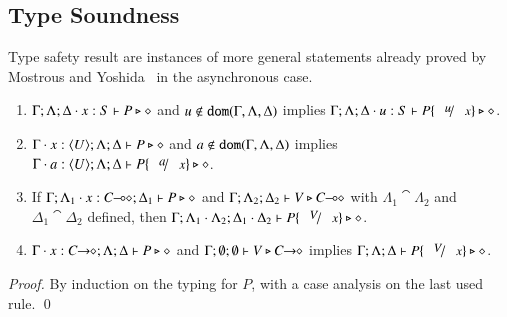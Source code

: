 \subsection{Type Soundness}

Type safety result are instances of more general
statements already proved by
Mostrous and Yoshida~\cite{tlca07} in the asynchronous case.
%
\begin{lemma}\rm
	\label{lem:subst}
	\begin{enumerate}[1.]
		\item	$\Gamma; \Lambda; \Delta \cdot x:S  \vdash P \triangleright \diamond$ and
			$u \not\in \mathtt{dom}(\Gamma, \Lambda, \Delta)$
			implies
			$\Gamma; \Lambda; \Delta \cat u:S  \proves P\subst{u}{x} \hastype \Proc$.

		\item	$\Gamma \cdot x:\langle U \rangle; \Lambda; \Delta \vdash P \triangleright \diamond$ and
			$a \notin \mathtt{dom}(\Gamma, \Lambda, \Delta)$
			implies
			$\Gamma \cat a:\chtype{U}; \Lambda; \Delta \proves P\subst{a}{x} \hastype \Proc$.

		\item	If $\Gamma; \Lambda_1 \cdot x:C\!\! \multimap\!\! \diamond; \Delta_1  \vdash P \triangleright \diamond$ 
			and $\Gamma; \Lambda_2; \Delta_2  \vdash V \triangleright C\!\! \multimap\!\! \diamond$ with 
			$\Lambda_1 \cat \Lambda_2$ and $\Delta_1 \cat \Delta_2$ defined,
			then $\Gamma; \Lambda_1 \cat \Lambda_2; \Delta_1 \cat \Delta_2  \proves P\subst{V}{x} \hastype \Proc$.

		\item	$\Gamma \cdot x:C\!\! \rightarrow\!\! \diamond; \Lambda; \Delta  \vdash P \triangleright \diamond$ and
			$\Gamma; \emptyset ; \emptyset \vdash V \triangleright C\!\! \rightarrow\!\! \diamond$
			implies
			$\Gamma; \Lambda; \Delta \proves P\subst{V}{x} \hastype \Proc$.
		\end{enumerate}
\end{lemma}
%
\begin{proof}
	By induction on the typing for $P$, with a case analysis on the last used rule. 
	\qed
\end{proof}

